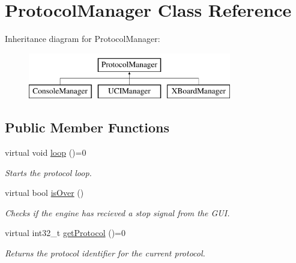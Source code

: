 \hypertarget{classProtocolManager}{}\section{Protocol\+Manager Class Reference}
\label{classProtocolManager}
Inheritance diagram for Protocol\+Manager\+:\begin{figure}[H]
\begin{center}
\leavevmode
\includegraphics[height=2.000000cm]{classProtocolManager}
\end{center}
\end{figure}
\subsection*{Public Member Functions}
\begin{DoxyCompactItemize}
\item 
virtual void \mbox{\hyperlink{classProtocolManager_aa3ae25a03e2f070ea486fd9319715a6a}{loop}} ()=0
\begin{DoxyCompactList}\small\item\em Starts the protocol loop. \end{DoxyCompactList}\item 
virtual bool \mbox{\hyperlink{classProtocolManager_a1cab1bcb93ca3542821965e62ee59c33}{is\+Over}} ()
\begin{DoxyCompactList}\small\item\em Checks if the engine has recieved a stop signal from the G\+UI. \end{DoxyCompactList}\item 
virtual int32\+\_\+t \mbox{\hyperlink{classProtocolManager_a2ab274fd7510b28e7ac36405aebdbe82}{get\+Protocol}} ()=0
\begin{DoxyCompactList}\small\item\em Returns the protocol identifier for the current protocol. \end{DoxyCompactList}\end{DoxyCompactItemize}
